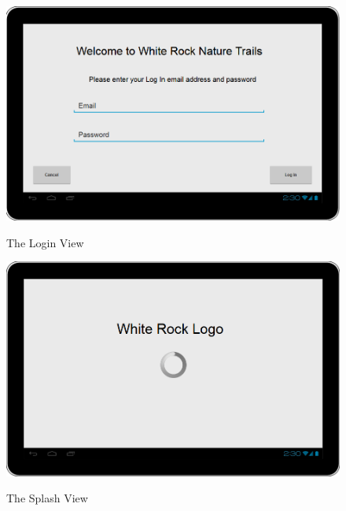 \documentclass[11pt,a4paper]{article}
\begin{document}
\begin{figure}[H]
\begin{center}
\includegraphics[scale=0.5]{LogIn.png}
\label{fig:loginView}
\caption{The Login View}
\end{center}
\end{figure}

\begin{figure}[H]
\begin{center}
\includegraphics[scale=0.5]{SplashScreen.png}
\label{fig:splashView}
\caption{The Splash View}
\end{center}
\end{figure}
\end{document}
